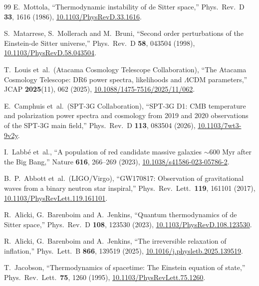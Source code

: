 \documentclass[aps,prd,twocolumn,superscriptaddress,nofootinbib]{revtex4-2}
\begin{document}
\begin{thebibliography}{99}
E.~Mottola,
``Thermodynamic instability of de Sitter space,''
Phys.\ Rev.\ D \textbf{33}, 1616 (1986),
\href{https://doi.org/10.1103/PhysRevD.33.1616}{10.1103/PhysRevD.33.1616}.

S.~Matarrese, S.~Mollerach and M.~Bruni,
``Second order perturbations of the Einstein-de Sitter universe,''
Phys.\ Rev.\ D \textbf{58}, 043504 (1998),
\href{https://doi.org/10.1103/PhysRevD.58.043504}{10.1103/PhysRevD.58.043504}.

T.~Louis et~al.\ (Atacama Cosmology Telescope Collaboration),
``The Atacama Cosmology Telescope: DR6 power spectra, likelihoods and $\Lambda$CDM parameters,''
JCAP \textbf{2025}(11), 062 (2025),
\href{https://doi.org/10.1088/1475-7516/2025/11/062}{10.1088/1475-7516/2025/11/062}.

E.~Camphuis et~al.\ (SPT-3G Collaboration),
``SPT-3G D1: CMB temperature and polarization power spectra and cosmology from 2019 and 2020 observations of the SPT-3G main field,''
Phys.\ Rev.\ D \textbf{113}, 083504 (2026),
\href{https://doi.org/10.1103/7wt3-9v2y}{10.1103/7wt3-9v2y}.

I.~Labb\'e et~al.,
``A population of red candidate massive galaxies $\sim$600 Myr after the Big Bang,''
Nature \textbf{616}, 266--269 (2023),
\href{https://doi.org/10.1038/s41586-023-05786-2}{10.1038/s41586-023-05786-2}.

B.~P.~Abbott et~al.\ (LIGO/Virgo),
``GW170817: Observation of gravitational waves from a binary neutron star inspiral,''
Phys.\ Rev.\ Lett.\ \textbf{119}, 161101 (2017),
\href{https://doi.org/10.1103/PhysRevLett.119.161101}{10.1103/PhysRevLett.119.161101}.

R.~Alicki, G.~Barenboim and A.~Jenkins,
``Quantum thermodynamics of de Sitter space,''
Phys.\ Rev.\ D \textbf{108}, 123530 (2023),
\href{https://doi.org/10.1103/PhysRevD.108.123530}{10.1103/PhysRevD.108.123530}.

R.~Alicki, G.~Barenboim and A.~Jenkins,
``The irreversible relaxation of inflation,''
Phys.\ Lett.\ B \textbf{866}, 139519 (2025),
\href{https://doi.org/10.1016/j.physletb.2025.139519}{10.1016/j.physletb.2025.139519}.

T.~Jacobson,
``Thermodynamics of spacetime: The Einstein equation of state,''
Phys.\ Rev.\ Lett.\ \textbf{75}, 1260 (1995),
\href{https://doi.org/10.1103/PhysRevLett.75.1260}{10.1103/PhysRevLett.75.1260}.


\end{thebibliography}
\end{document}
